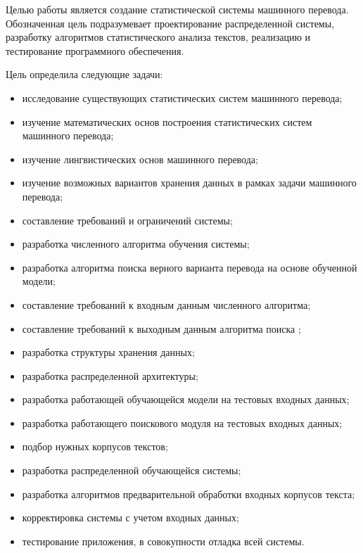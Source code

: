 
Целью работы является создание статистической системы машинного перевода.
Обозначенная цель подразумевает проектирование распределенной системы,
разработку алгоритмов статистического анализа текстов, 
реализацию и тестирование программного обеспечения.

\pagebreak

Цель определила следующие задачи:
\begin{itemize}
	\item исследование существующих статистических систем машинного перевода;
	\item изучение математических основ построения статистических систем машинного перевода;
	\item изучение лингвистических основ машинного перевода;
	\item изучение возможных вариантов хранения данных в рамках задачи машинного перевода;
	\item составление требований и ограничений системы;
	\item разработка численного алгоритма обучения системы;
	\item разработка алгоритма поиска верного варианта перевода на основе обученной модели;
	\item составление требований к входным данным численного алгоритма;
	\item составление требований к выходным данным алгоритма поиска ;
	\item разработка структуры хранения данных;
	\item разработка распределенной архитектуры;
	\item разработка работающей обучающейся модели на тестовых входных данных;
	\item разработка работающего  поискового модуля на тестовых входных данных;
	\item подбор нужных корпусов текстов;
	\item разработка распределенной обучающейся системы;
	\item разработка алгоритмов предварительной обработки входных корпусов текста;
	\item корректировка  системы с учетом входных данных;
	\item тестирование приложения, в совокупности отладка всей системы.
\end{itemize}



